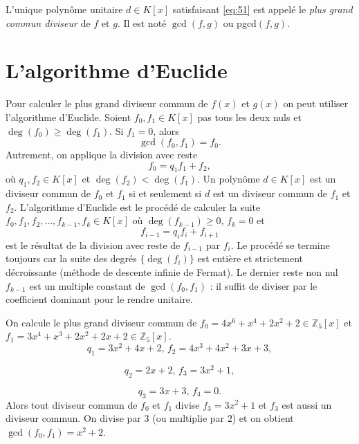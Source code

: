\begin{definition}
  \label{def:56}
  L'unique polynôme unitaire $d ∈ K[x]$ satisfaisant \eqref{eq:51} est appelé  le \emph{plus grand commun diviseur} de $f$ et $g$. Il est noté $\gcd(f,g)$ ou pgcd$(f,g)$.
\end{definition}

\section{L'algorithme d'Euclide}
\label{sec:lalg-de-eucl}



Pour calculer le plus grand diviseur commun de $f(x)$ et $g(x)$  on peut utiliser l'algorithme d'Euclide. Soient $f_0,f_1 ∈K[x]$ pas tous les deux nuls et $\deg(f_0) ≥ \deg(f_1)$. Si $f_1 = 0$, alors
\begin{displaymath}
\gcd(f_0,f_1) =   f_0. 
\end{displaymath}
Autrement, on applique la division avec reste
\begin{displaymath}
  f_0 = q_1 f_1 + f_2, 
\end{displaymath}
où $q_1,f_2 ∈K[x]$ et $ \deg(f_2)< \deg(f_1)$. Un polynôme  $d ∈K[x]$ est un diviseur commun de $f_0$ et $f_1$ si et seulement si $d$ est un diviseur commun de $f_1$ et $f_2$. L'algorithme d'Euclide est le procédé de calculer la suite $f_0,f_1,f_2,\dots,f_{k-1},f_k ∈K[x]$  où $\deg(f_{k-1})≥0$, $f_k=0$ et 
\begin{displaymath}
  f_{i-1} = q_i f_i + f_{i+1} 
\end{displaymath}
est le résultat de la division avec reste de $f_{i-1} $ par $f_i$. Le procédé se termine toujours car la suite des degrés $\{\deg(f_i)\}$ est entière et strictement décroissante (méthode de descente infinie de Fermat). Le dernier reste non nul $f_{k-1}$ est un multiple constant de $\gcd(f_0,f_1)$ : il suffit de diviser par le coefficient dominant pour le rendre unitaire.


\begin{example}
  \label{exe:25-b}
  On calcule le plus grand diviseur commun de
$f_0 =  4 x^{6} + x^{4} + 2 x^{2} + 2 ∈ℤ_5[x]$  et 
$f_1 =  3 x^{4} + x^{3} + 2 x^{2} + 2 x + 2 ∈ℤ_5[x]$. 
  \begin{displaymath}
   q_1 =  3 x^{2} + 4 x + 2, \, 
   f_2 =  4 x^{3} + 4 x^{2} + 3 x + 3, 
 \end{displaymath}

 \begin{displaymath}
   q_2 =  2 x + 2, \, 
f_3 =  3 x^{2} + 1, 
\end{displaymath}

\begin{displaymath}
  q_3 =  3 x + 3, \, 
  f_4 =  0. 
\end{displaymath}
Alors tout diviseur commun de $f_0$ et $f_1$ divise $f_3 =  3 x^{2} + 1$ et $f_3$ est aussi un diviseur commun. On divise par $3$ (ou multiplie par $2$) et on obtient  $\gcd(f_0,f_1) = x^2 +2$. 

\end{example}

